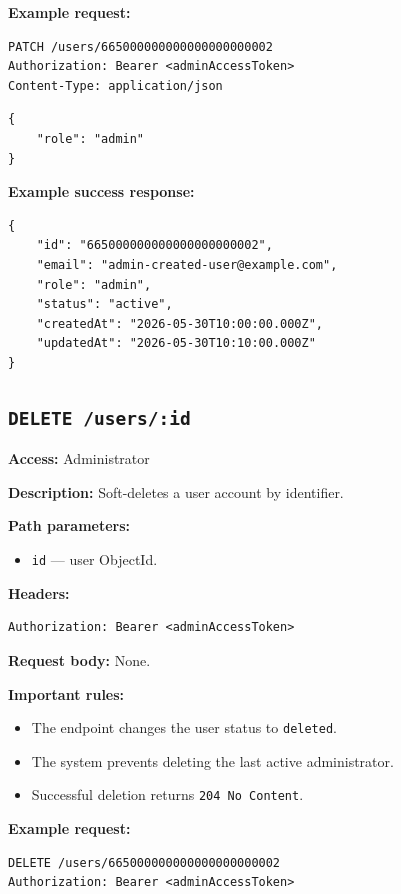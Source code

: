 \textbf{Example request:}

\begin{verbatim}
PATCH /users/665000000000000000000002
Authorization: Bearer <adminAccessToken>
Content-Type: application/json
\end{verbatim}

\begin{verbatim}
{
    "role": "admin"
}
\end{verbatim}

\pagebreak
\textbf{Example success response:}

\begin{verbatim}
{
    "id": "665000000000000000000002",
    "email": "admin-created-user@example.com",
    "role": "admin",
    "status": "active",
    "createdAt": "2026-05-30T10:00:00.000Z",
    "updatedAt": "2026-05-30T10:10:00.000Z"
}
\end{verbatim}

\subsection{\texttt{DELETE /users/:id}}

\textbf{Access:} Administrator

\textbf{Description:} Soft-deletes a user account by identifier.

\textbf{Path parameters:}

\begin{itemize}
    \item \texttt{id} --- user ObjectId.
\end{itemize}

\textbf{Headers:}

\begin{verbatim}
Authorization: Bearer <adminAccessToken>
\end{verbatim}

\textbf{Request body:} None.

\textbf{Important rules:}

\begin{itemize}
    \item The endpoint changes the user status to \texttt{deleted}.
    \item The system prevents deleting the last active administrator.
    \item Successful deletion returns \texttt{204 No Content}.
\end{itemize}

\textbf{Example request:}

\begin{verbatim}
DELETE /users/665000000000000000000002
Authorization: Bearer <adminAccessToken>
\end{verbatim}